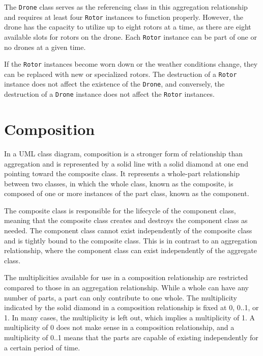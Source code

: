 \documentclass[
	12pt,
    a4paper,
    egregdoesnotlikesansseriftitles, %
    toc=chapterentrywithdots,
    oneside, openany,
    titlepage,
    parskip=half,
    headings=normal,  %
    listof=totoc,
    bibliography=totoc,
    index=totoc,
    captions=tableheading,  %
    listof=flat,
    numbers=noenddot, %
    final]
    {scrbook}
\begin{document}
The \texttt{Drone} class serves as the referencing class in this aggregation relationship and requires at least four \texttt{Rotor} instances to function properly. 
However, the drone has the capacity to utilize up to eight rotors at a time, as there are eight available slots for rotors on the drone. 
Each \texttt{Rotor} instance can be part of one or no drones at a given time.

If the \texttt{Rotor} instances become worn down or the weather conditions change, they can be replaced with new or specialized rotors. 
The destruction of a \texttt{Rotor} instance does not affect the existence of the \texttt{Drone}, and conversely, the destruction of a \texttt{Drone} instance does not affect the \texttt{Rotor} instances.


\section{Composition}

In a UML class diagram, composition is a stronger form of relationship than aggregation and is represented by a solid line with a solid diamond at one end pointing toward the composite class. It represents a whole-part relationship between two classes, in which the whole class, known as the composite, is composed of one or more instances of the part class, known as the component.

The composite class is responsible for the lifecycle of the component class, meaning that the composite class creates and destroys the component class as needed. The component class cannot exist independently of the composite class and is tightly bound to the composite class. This is in contrast to an aggregation relationship, where the component class can exist independently of the aggregate class.

The multiplicities available for use in a composition relationship are restricted compared to those in an aggregation relationship. While a whole can have any number of parts, a part can only contribute to one whole. The multiplicity indicated by the solid diamond in a composition relationship is fixed at 0, 0..1, or 1. In many cases, the multiplicity is left out, which implies a multiplicity of 1. A multiplicity of 0 does not make sense in a composition relationship, and a multiplicity of 0..1 means that the parts are capable of existing independently for a certain period of time.
 \cite[p. 153-154]{uml}
\end{document}
